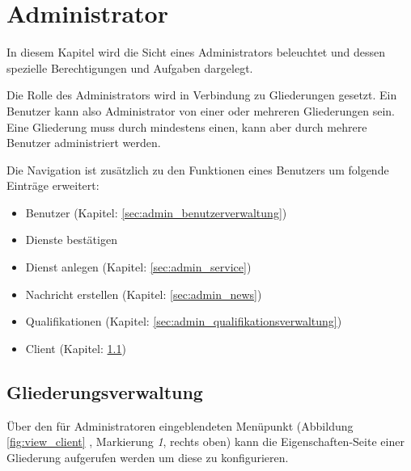 \chapter{Administrator}
\label{cha:administrator}
In diesem Kapitel wird die Sicht eines Administrators beleuchtet und dessen spezielle Berechtigungen und Aufgaben dargelegt.

\vspace*{5mm} \noindent Die Rolle des Administrators wird in Verbindung zu Gliederungen gesetzt. Ein Benutzer kann also Administrator von einer oder mehreren Gliederungen sein. Eine Gliederung muss durch mindestens einen, kann aber durch mehrere Benutzer administriert werden.

\vspace*{5mm} \noindent Die Navigation ist zusätzlich zu den Funktionen eines Benutzers um folgende Einträge erweitert: 
\begin{itemize}
	\item Benutzer (Kapitel: \ref{sec:admin_benutzerverwaltung})
	\item Dienste bestätigen
	\item Dienst anlegen (Kapitel: \ref{sec:admin_service})
	\item Nachricht erstellen (Kapitel: \ref{sec:admin_news})
	\item Qualifikationen (Kapitel: \ref{sec:admin_qualifikationsverwaltung})
	\item Client (Kapitel: \ref{sec:admin_gliederungsverwaltung})
\end{itemize}

\section{Gliederungsverwaltung}
\label{sec:admin_gliederungsverwaltung}
Über den für Administratoren eingeblendeten Menüpunkt \noindent (Abbildung \ref{fig:view_client} \textit{}, Markierung \textit{1}, rechts oben) kann die Eigenschaften-Seite einer Gliederung aufgerufen werden um diese zu konfigurieren.

